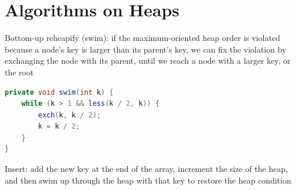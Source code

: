\documentclass[8pt,a4paper,compress]{beamer}
\begin{document}
\section{Algorithms on Heaps}
\begin{frame}[fragile]
\pause

Bottom-up reheapify (swim): if the maximum-oriented heap order is violated because a node's key is larger than its parent's key, we can fix the violation by exchanging the node with its parent, until we reach a node with a larger key, or the root

\pause
\bigskip

\begin{minipage}{150pt}
\begin{lstlisting}[language=Java]
private void swim(int k) {
    while (k > 1 && less(k / 2, k)) { 
        exch(k, k / 2); 
        k = k / 2; 
    }
}
\end{lstlisting}
\end{minipage}%
\begin{minipage}{130pt}
\hfill {}
\end{minipage}

\pause
\bigskip

Insert: add the new key at the end of the array, increment the size of the heap, and then swim up through the heap with that key to restore the heap condition
\end{frame}
\end{document}
